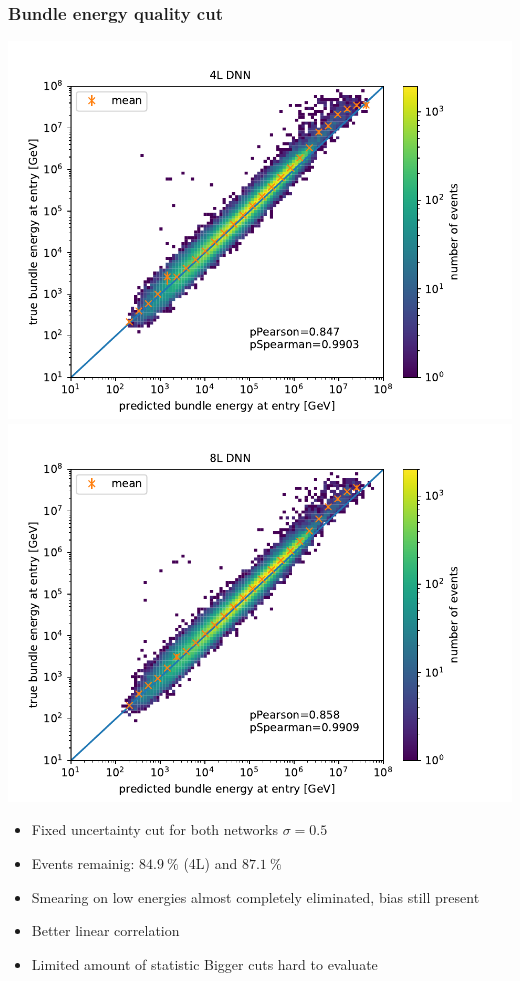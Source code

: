 \documentclass[aspectratio=1610, 9pt]{beamer}
\begin{document}
\begin{frame}
  \frametitle{Bundle energy quality cut}
  \includegraphics[scale=0.4]{Plots/correlation_4L_bundle_cut.pdf}
  \includegraphics[scale=0.4]{Plots/correlation_8L_bundle_cut.pdf}
  \begin{itemize}
    \item Fixed uncertainty cut for both networks $\sigma=\num{0.5}$
    \item Events remainig: $\SI{84,9}{\percent}$ (4L) and  $\SI{87,1}{\percent}$
    \item Smearing on low energies almost completely eliminated, bias still present
    \item Better linear correlation
    \item Limited amount of statistic \rightarrow Bigger cuts hard to evaluate
  \end{itemize}
\end{frame}
\end{document}

